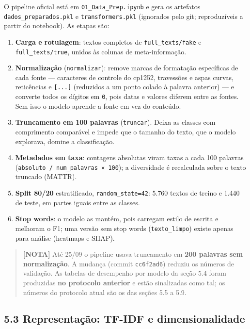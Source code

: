 \documentclass[
  brazilian,
  11pt,
]{article}
\providecommand{\tightlist}{%
  \setlength{\itemsep}{0pt}\setlength{\parskip}{0pt}}
\begin{document}
O pipeline oficial está em \texttt{01\_Data\_Prep.ipynb} e gera os artefatos \texttt{dados\_preparados.pkl} e \texttt{transformers.pkl} (ignorados pelo git; reproduzíveis a partir do notebook). As etapas são:

\begin{enumerate}
\def\labelenumi{\arabic{enumi}.}
\tightlist
\item
  \textbf{Carga e rotulagem}: textos completos de \texttt{full\_texts/fake} e \texttt{full\_texts/true}, unidos às colunas de meta-informação.
\item
  \textbf{Normalização} (\texttt{normalizar}): remove marcas de formatação específicas de cada fonte --- caracteres de controle do cp1252, travessões e aspas curvas, reticências e \texttt{{[}...{]}} (reduzidos a um ponto colado à palavra anterior) --- e converte todos os dígitos em \texttt{0}, pois datas e valores diferem entre as fontes. Sem isso o modelo aprende a fonte em vez do conteúdo.
\item
  \textbf{Truncamento em 100 palavras} (\texttt{truncar}). Deixa as classes com comprimento comparável e impede que o tamanho do texto, que o modelo explorava, domine a classificação.
\item
  \textbf{Metadados em taxa}: contagens absolutas viram taxas a cada 100 palavras (\texttt{absoluto\ /\ num\_palavras\ ×\ 100}); a diversidade é recalculada sobre o texto truncado (MATTR).
\item
  \textbf{Split 80/20} estratificado, \texttt{random\_state=42}: 5.760 textos de treino e 1.440 de teste, em partes iguais entre as classes.
\item
  \textbf{Stop words}: o modelo as mantém, pois carregam estilo de escrita e melhoram o F1; uma versão sem stop words (\texttt{texto\_limpo}) existe apenas para análise (heatmaps e SHAP).
\end{enumerate}

\begin{quote}
\textbf{{[}NOTA{]}} Até 25/09 o pipeline usava truncamento em \textbf{200 palavras sem normalização}. A mudança (commit \texttt{cc6f2ad6}) reduziu os números de validação. As tabelas de desempenho por modelo da seção 5.4 foram produzidas \textbf{no protocolo anterior} e estão sinalizadas como tal; os números do protocolo atual são os das seções 5.5 a 5.9.
\end{quote}

\subsection{5.3 Representação: TF-IDF e dimensionalidade}\label{representauxe7uxe3o-tf-idf-e-dimensionalidade}
\end{document}
